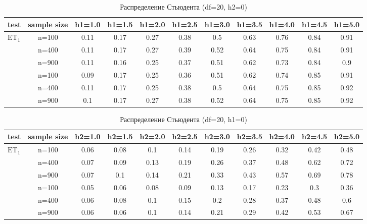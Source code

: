 \documentclass[12pt]{article}
\theoremstyle{break}
\begin{document}
\begin{table}[!h]
	\centering
	\caption{Распределение Стьюдента (df=20, h2=0)}
	\begin{tabular}{l c c c c c c c c c c} 
		\toprule
		test & sample size & h1=1.0 & h1=1.5 & h1=2.0 & h1=2.5 & h1=3.0 & h1=3.5 & h1=4.0 & h1=4.5 & h1=5.0 \\ 
		\midrule
		\multirow{3}{*}{$\text{ET}_1$} 
		& n=100 & 0.11 & 0.17 & 0.27 & 0.38 & 0.5 & 0.63 & 0.76 & 0.84 & 0.91 \\ 
		& n=400 & 0.11 & 0.17 & 0.27 & 0.39 & 0.52 & 0.64 & 0.75 & 0.84 & 0.91 \\ 
		& n=900 & 0.11 & 0.16 & 0.25 & 0.37 & 0.51 & 0.62 & 0.73 & 0.84 & 0.9 \\ 
		\addlinespace
		\addlinespace
		\multirow{3}{*}{$\text{ET}_2$} 
		& n=100 & 0.09 & 0.17 & 0.25 & 0.36 & 0.51 & 0.62 & 0.74 & 0.85 & 0.91 \\ 
		& n=400 & 0.11 & 0.17 & 0.25 & 0.38 & 0.5 & 0.64 & 0.75 & 0.85 & 0.92 \\ 
		& n=900 & 0.1 & 0.17 & 0.27 & 0.38 & 0.52 & 0.64 & 0.75 & 0.85 & 0.92 \\ 
		\bottomrule
	\end{tabular}
	\label{tbl:et_comp_student20_h1}
\end{table}


\begin{table}[!h]
	\centering
	\caption{Распределение Стьюдента (df=20, h1=0)}
	\begin{tabular}{l c c c c c c c c c c} 
		\toprule
		test & sample size & h2=1.0 & h2=1.5 & h2=2.0 & h2=2.5 & h2=3.0 & h2=3.5 & h2=4.0 & h2=4.5 & h2=5.0 \\ 
		\midrule
		\multirow{3}{*}{$\text{ET}_1$} 
		& n=100 & 0.06 & 0.08 & 0.1 & 0.14 & 0.19 & 0.26 & 0.32 & 0.42 & 0.48 \\ 
		& n=400 & 0.07 & 0.09 & 0.13 & 0.19 & 0.26 & 0.37 & 0.48 & 0.62 & 0.72 \\ 
		& n=900 & 0.07 & 0.1 & 0.14 & 0.21 & 0.33 & 0.43 & 0.57 & 0.69 & 0.78 \\ 
		\addlinespace
		\addlinespace
		\multirow{3}{*}{$\text{ET}_2$} 
		& n=100 & 0.05 & 0.06 & 0.08 & 0.09 & 0.13 & 0.17 & 0.23 & 0.3 & 0.36 \\ 
		& n=400 & 0.06 & 0.08 & 0.1 & 0.15 & 0.2 & 0.28 & 0.37 & 0.48 & 0.6 \\ 
		& n=900 & 0.06 & 0.06 & 0.1 & 0.14 & 0.21 & 0.29 & 0.42 & 0.53 & 0.67 \\ 
		\bottomrule
	\end{tabular}
	\label{tbl:et_comp_student20_h2}
\end{table}
\end{document}
